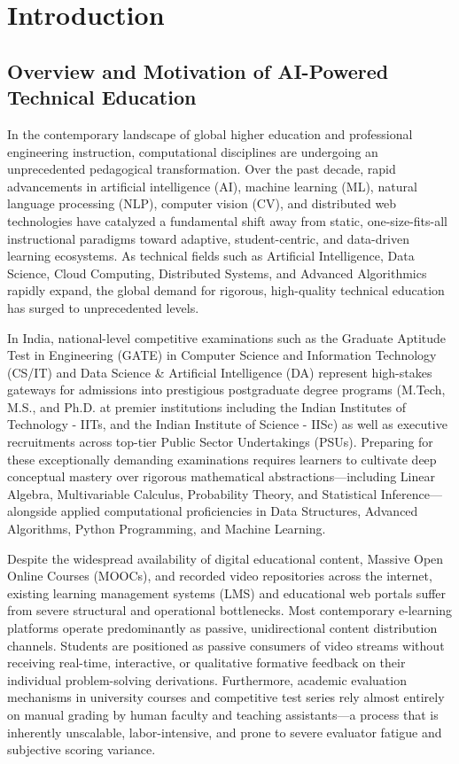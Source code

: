 \chapter{Introduction}

\section{Overview and Motivation of AI-Powered Technical Education}
In the contemporary landscape of global higher education and professional engineering instruction, computational disciplines are undergoing an unprecedented pedagogical transformation. Over the past decade, rapid advancements in artificial intelligence (AI), machine learning (ML), natural language processing (NLP), computer vision (CV), and distributed web technologies have catalyzed a fundamental shift away from static, one-size-fits-all instructional paradigms toward adaptive, student-centric, and data-driven learning ecosystems. As technical fields such as Artificial Intelligence, Data Science, Cloud Computing, Distributed Systems, and Advanced Algorithmics rapidly expand, the global demand for rigorous, high-quality technical education has surged to unprecedented levels.

In India, national-level competitive examinations such as the Graduate Aptitude Test in Engineering (GATE) in Computer Science and Information Technology (CS/IT) and Data Science \& Artificial Intelligence (DA) represent high-stakes gateways for admissions into prestigious postgraduate degree programs (M.Tech, M.S., and Ph.D. at premier institutions including the Indian Institutes of Technology - IITs, and the Indian Institute of Science - IISc) as well as executive recruitments across top-tier Public Sector Undertakings (PSUs). Preparing for these exceptionally demanding examinations requires learners to cultivate deep conceptual mastery over rigorous mathematical abstractions—including Linear Algebra, Multivariable Calculus, Probability Theory, and Statistical Inference—alongside applied computational proficiencies in Data Structures, Advanced Algorithms, Python Programming, and Machine Learning.

Despite the widespread availability of digital educational content, Massive Open Online Courses (MOOCs), and recorded video repositories across the internet, existing learning management systems (LMS) and educational web portals suffer from severe structural and operational bottlenecks. Most contemporary e-learning platforms operate predominantly as passive, unidirectional content distribution channels. Students are positioned as passive consumers of video streams without receiving real-time, interactive, or qualitative formative feedback on their individual problem-solving derivations. Furthermore, academic evaluation mechanisms in university courses and competitive test series rely almost entirely on manual grading by human faculty and teaching assistants—a process that is inherently unscalable, labor-intensive, and prone to severe evaluator fatigue and subjective scoring variance.

